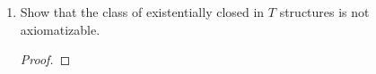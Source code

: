 \documentclass{article}
\begin{document}
\begin{enumerate}[label={\bf Q\arabic*:}]
\begin{enumerate}
      \item Show that the class of existentially closed in $T$ structures
        is not axiomatizable.
        \begin{proof}
        \end{proof}
    \end{enumerate}
\end{enumerate}
\end{document}
